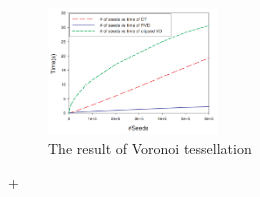 \begin{itemize}
\begin{figure}[ht!]
        \centering
        \includegraphics[width=0.4\textwidth]{img/clipped}
        \caption{The result of Voronoi tessellation}
        \label{voro}
    \end{figure}
\end{itemize}



 +